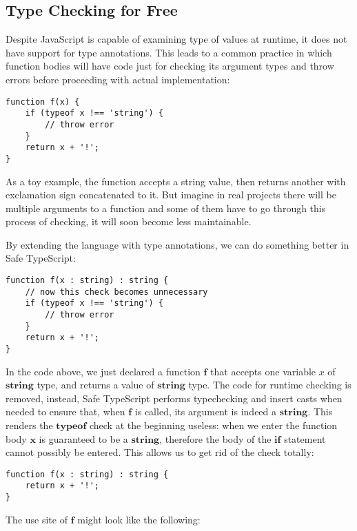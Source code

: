 \subsection{Type Checking for Free}

Despite JavaScript is capable of examining type of values at runtime,
it does not have support for type annotations.
This leads to a common practice in which function bodies will have code
just for checking its argument types and throw errors before
proceeding with actual implementation:

\begin{verbatim}
function f(x) {
    if (typeof x !== 'string') {
        // throw error
    }
    return x + '!';
}
\end{verbatim}

As a toy example, the function accepts a string value,
then returns another with exclamation sign concatenated to it. 
But imagine in real projects there will be multiple arguments to a function
and some of them have to go through this process of checking,
it will soon become less maintainable.

By extending the language with type annotations,
we can do something better in Safe TypeScript:

\begin{verbatim}
function f(x : string) : string {
    // now this check becomes unnecessary
    if (typeof x !== 'string') {
        // throw error
    }
    return x + '!';
}
\end{verbatim}

In the code above, we just declared a function $\textbf{f}$ that accepts
one variable $x$ of $\textbf{string}$ type, and returns a value of $\textbf{string}$ type.
The code for runtime checking is removed, instead, Safe TypeScript performs typechecking
and insert casts when needed to ensure that,
when $\textbf{f}$ is called, its argument is indeed a $\textbf{string}$.
This renders the  $\textbf{typeof}$ check at the beginning useless:
when we enter the function body $\textbf{x}$ is guaranteed to be a $\textbf{string}$,
therefore the body of the $\textbf{if}$ statement cannot possibly be entered.
This allows us to get rid of the check totally:


\begin{verbatim}
function f(x : string) : string {
    return x + '!';
}
\end{verbatim}

The use site of $\textbf{f}$ might look like the following:

